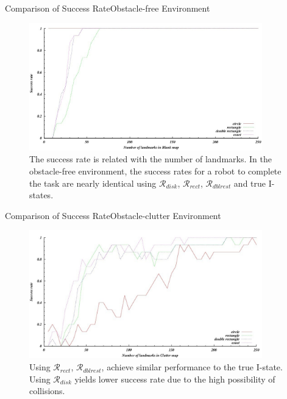 \begin{frame}{Comparison of Success Rate}{Obstacle-free Environment}
\begin{figure}
    \includegraphics[width=0.9\textwidth]{figs/rate-obs.jpg}
    \caption{The success rate is related with the number of landmarks.  In the
      obstacle-free environment, the success rates for a robot to complete the
      task are nearly identical using $\mathcal{R}_{disk}$,
      $\mathcal{R}_{rect}$, $\mathcal{R}_{dblrest}$ and true I-states.}
\end{figure}
\end{frame}

\begin{frame}{Comparison of Success Rate}{Obstacle-clutter Environment}
\begin{figure}
    \includegraphics[width=0.9\textwidth]{figs/rate-clutter.jpg}
    \caption{Using $\mathcal{R}_{rect}$, $\mathcal{R}_{dblrest}$, achieve
      similar performance to the true I-state. Using $\mathcal{R}_{disk}$ yields
      lower success rate due to the high possibility of collisions.}
\end{figure}
\end{frame}


